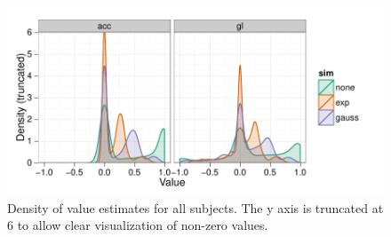 \begin{figure}[tp]
    \includegraphics{f_density_value}
    \centering
    \caption{Density of value estimates for all subjects.  The y axis is truncated at 6 to allow clear visualization of non-zero values.}
    \label{fig:denvalue}
\end{figure}
\clearpage